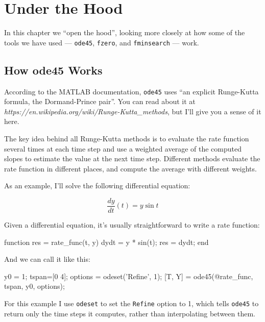 \chapter{Under the Hood}
\label{how}

In this chapter we ``open the hood'', looking more closely at how some of the tools we have used --- {\tt ode45}, {\tt fzero}, and {\tt fminsearch} --- work.


\section{How ode45 Works}
\label{howode45}

According to the MATLAB documentation, {\tt ode45} uses ``an explicit Runge-Kutta formula, the Dormand-Prince pair''.  You can read about it at \emph{https://en.wikipedia.org/wiki/Runge-Kutta\_methods}, but I'll give you a sense of it here.


The key idea behind all Runge-Kutta methods is to evaluate the rate function several times at each time step and use a weighted average of the computed slopes to estimate the value at the next time step.  
Different methods evaluate the rate function in different places, and compute the average with different weights.


As an example, I'll solve the following differential equation:

\[ \frac{dy}{dt}(t) = y \sin t \] 

Given a differential equation, it's usually straightforward to write a rate function:

\begin{code}
function res = rate_func(t, y)
    dydt = y * sin(t);
    res = dydt;
end
\end{code}

And we can call it like this:

\begin{code}
    y0 = 1;
    tspan=[0 4];
    options = odeset('Refine', 1);
    [T, Y] = ode45(@rate_func, tspan, y0, options);
\end{code}

For this example I use {\tt odeset} to set the {\tt Refine} option to 1, which tells {\tt ode45} to return only the time steps it computes, rather than interpolating between them.

